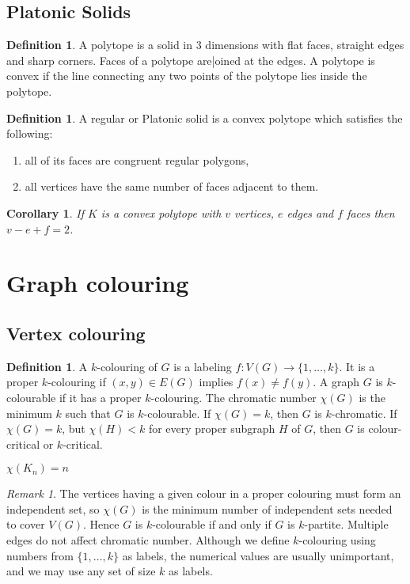 \documentclass[10pt, fleqn, a4paper, landscape]{article}
\theoremstyle{plain} %
\newtheorem{cor}[thm]{Corollary}
\theoremstyle{remark} %
\newtheorem{rem}[thm]{Remark}
\theoremstyle{definition} %
\newtheorem{defi}[thm]{Definition}
\begin{document}
\begin{multicols}{3}
\begin{tiny}
\subsection{Platonic Solids}

\begin{defi}
A polytope is a solid in 3 dimensions with flat faces, straight edges and sharp corners. Faces of a polytope are|oined at the edges. A polytope is convex if the line connecting any two points of the polytope lies inside the polytope.
\end{defi}
\addtocounter{thm}{1}
\begin{defi}
A regular or Platonic solid is a convex polytope which satisfies the following:
\begin{enumerate}
\item all of its faces are congruent regular polygons,
\item all vertices have the same number of faces adjacent to them.
\end{enumerate}
\end{defi}
 
\begin{cor}
If $K$ is a convex polytope with $v$ vertices, $e$ edges and $f$ faces then $v - e + f = 2$.
\end{cor}

\section{Graph colouring}
\subsection{Vertex colouring}

\begin{defi}
A $k$-colouring of $G$ is a labeling $f : V (G) \to \{1, \dots , k\}$. It is a proper $k$-colouring if $(x, y) \in E(G)$ implies $f(x) \ne f(y)$. A graph $G $ is $k$-colourable if it has a proper $k$-colouring. The
chromatic number $\chi(G)$ is the minimum $k$ such that $G$ is $k$-colourable. If $\chi(G) = k$, then $G$ is
$k$-chromatic. If $\chi(G) = k$, but $\chi(H) < k$ for every proper subgraph $H$ of $G$, then $G$ is colour-critical or $k$-critical.

$\chi(K_n) = n$
\end{defi}
\addtocounter{thm}{1}
\begin{rem}
The vertices having a given colour in a proper colouring must form an independent set, so $\chi(G)$ is the minimum number of independent sets needed to cover $V (G).$ Hence $G$ is $k$-colourable if and only if $G$ is $k$-partite. Multiple edges do not affect chromatic number. Although we define
$k$-colouring using numbers from $\{1, \dots , k\}$ as labels, the numerical values are usually unimportant, and we may use any set of size $k$ as labels.
\end{rem}


\end{tiny}
\end{multicols}
\end{document}
